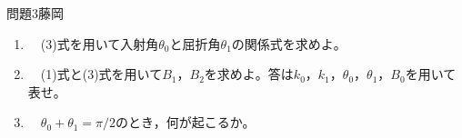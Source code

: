 \documentclass[fleqn]{jbook}
\begin{document}
\begin{question}{問題3}{藤岡}
\begin{enumerate}
    \begin{enumerate}

        \item 　(3)式を用いて入射角$\theta_0$と屈折角$\theta_1$の関係式を求めよ。\\
        
        \item 　(1)式と(3)式を用いて$B_1$，$B_2$を求めよ。答は$k_0$，$k_1$，$\theta_0$，$\theta_1$，$B_0$を用いて表せ。\\

        \item  　$\theta_0+\theta_1=\pi/2$のとき，何が起こるか。\\
\end{enumerate}
\end{enumerate}

\end{question}

\end{document}
